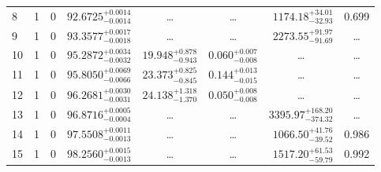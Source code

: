 \begin{table*}[!]
\begin{tabular}{llcrrlrc}
8 & 1 & 0 & $     92.6725_{-      0.0014}^{+      0.0014}$ & \multicolumn{1}{c}{\dots} & \multicolumn{1}{c}{\dots} & $     1174.18_{-       32.93}^{+       34.01}$ & 0.699 \\[1pt]
9 & 1 & 0 & $     93.3577_{-      0.0018}^{+      0.0017}$ & \multicolumn{1}{c}{\dots} & \multicolumn{1}{c}{\dots} & $     2273.55_{-       91.69}^{+       91.97}$ & \dots \\[1pt]
10 & 1 & 0 & $     95.2872_{-      0.0032}^{+      0.0034}$ & $      19.948_{-       0.943}^{+       0.878}$ & $       0.060_{-       0.008}^{+       0.007}$ & \multicolumn{1}{c}{\dots} & \dots \\[1pt]
11 & 1 & 0 & $     95.8050_{-      0.0066}^{+      0.0069}$ & $      23.373_{-       0.845}^{+       0.825}$ & $       0.144_{-       0.015}^{+       0.013}$ & \multicolumn{1}{c}{\dots} & \dots \\[1pt]
12 & 1 & 0 & $     96.2681_{-      0.0031}^{+      0.0030}$ & $      24.138_{-       1.370}^{+       1.318}$ & $       0.050_{-       0.008}^{+       0.008}$ & \multicolumn{1}{c}{\dots} & \dots \\[1pt]
13 & 1 & 0 & $     96.8716_{-      0.0004}^{+      0.0005}$ & \multicolumn{1}{c}{\dots} & \multicolumn{1}{c}{\dots} & $     3395.97_{-      374.32}^{+      168.20}$ & \dots \\[1pt]
14 & 1 & 0 & $     97.5508_{-      0.0013}^{+      0.0011}$ & \multicolumn{1}{c}{\dots} & \multicolumn{1}{c}{\dots} & $     1066.50_{-       39.52}^{+       41.76}$ & 0.986 \\[1pt]
15 & 1 & 0 & $     98.2560_{-      0.0013}^{+      0.0015}$ & \multicolumn{1}{c}{\dots} & \multicolumn{1}{c}{\dots} & $     1517.20_{-       59.79}^{+       61.53}$ & 0.992 \\[1pt]
 

\end{tabular}
\end{table*}
